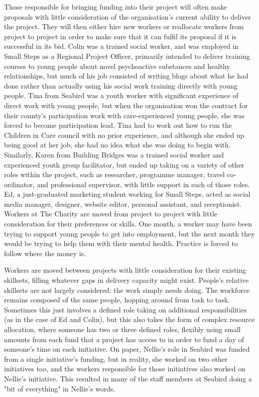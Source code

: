 Those responsible for bringing funding into their project will often make proposals with little consideration of the organisation's current ability to deliver the project. They will then either hire new workers or reallocate workers from project to project in order to make sure that it can fulfil its proposal if it is successful in its bid. Colin was a trained social worker, and was employed in Small Steps as a Regional Project Officer, primarily intended to deliver training courses to young people about novel psychoactive substances and healthy relationships, but much of his job consisted of writing blogs about what he had done rather than actually using his social work training directly with young people. Tina from Seabird was a youth worker with significant experience of direct work with young people, but when the organisation won the contract for their county’s participation work with care-experienced young people, she was forced to become participation lead. Tina had to work out how to run the Children in Care council with no prior experience, and although she ended up being good at her job, she had no idea what she was doing to begin with. Similarly, Karen from Building Bridges was a trained social worker and experienced youth group facilitator, but ended up taking on a variety of other roles within the project, such as researcher, programme manager, travel co-ordinator, and professional supervisor, with little support in each of those roles. Ed, a just-graduated marketing student working for Small Steps, acted as social media manager, designer, website editor, personal assistant, and receptionist. Workers at The Charity are moved from project to project with little consideration for their preferences or skills. One month, a worker may have been trying to support young people to get into employment, but the next month they would be  trying to help them with their mental health. Practice is forced to follow where the money is.

Workers are moved between projects with little consideration for their existing skillsets, filling whatever gaps in delivery capacity might exist. People's relative skillsets are not largely considered: the work simply needs doing. The workforce remains composed of the same people, hopping around from task to task. Sometimes this just involves a defined role taking on additional responsibilities (as in the case of Ed and Colin), but this also takes the form of complex resource allocation, where someone has two or three defined roles, flexibly using small amounts from each fund that a project has access to in order to fund a day of someone’s time on each initiative. On paper, Nellie's role in Seabird was funded from a single initiative’s funding, but in reality, she worked on two other initiatives too, and the workers responsible for those initiatives also worked on Nellie’s initiative. This resulted in many of the staff members at Seabird doing a "bit of everything" in Nellie’s words. 

